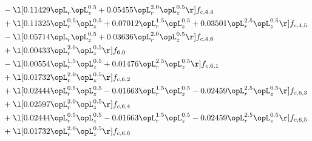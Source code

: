 \begin{alignat}{2}
& - \l[  0.11429 \opL_r \opL_z^{0.5} +  0.05455 \opL_r^{2.0} \opL_z^{0.5}  \r] f_{c,4,4} \nonumber \\ 
& + \l[  0.11325 \opL_r^{0.5} \opL_z^{0.5} +  0.07012 \opL_r^{1.5} \opL_z^{0.5} +  0.03501 \opL_r^{2.5} \opL_z^{0.5}  \r] f_{c,4,5} \nonumber \\ 
& - \l[  0.05714 \opL_r \opL_z^{0.5} +  0.03636 \opL_r^{2.0} \opL_z^{0.5}  \r] f_{c,4,6} \nonumber \\ 
& + \l[  0.00433 \opL_r^{2.0} \opL_z^{0.5}  \r] f_{6,0} \nonumber \\ 
& - \l[  0.00554 \opL_r^{1.5} \opL_z^{0.5} +  0.01476 \opL_r^{2.5} \opL_z^{0.5}  \r] f_{c,6,1} \nonumber \\ 
& + \l[  0.01732 \opL_r^{2.0} \opL_z^{0.5}  \r] f_{c,6,2} \nonumber \\ 
& + \l[  0.02444 \opL_r^{0.5} \opL_z^{0.5}   -0.01663 \opL_r^{1.5} \opL_z^{0.5}   -0.02459 \opL_r^{2.5} \opL_z^{0.5}  \r] f_{c,6,3} \nonumber \\ 
& + \l[  0.02597 \opL_r^{2.0} \opL_z^{0.5}  \r] f_{c,6,4} \nonumber \\ 
& + \l[  0.02444 \opL_r^{0.5} \opL_z^{0.5}   -0.01663 \opL_r^{1.5} \opL_z^{0.5}   -0.02459 \opL_r^{2.5} \opL_z^{0.5}  \r] f_{c,6,5} \nonumber \\ 
& + \l[  0.01732 \opL_r^{2.0} \opL_z^{0.5}  \r] f_{c,6,6} \nonumber \\ 
\end{alignat} 


